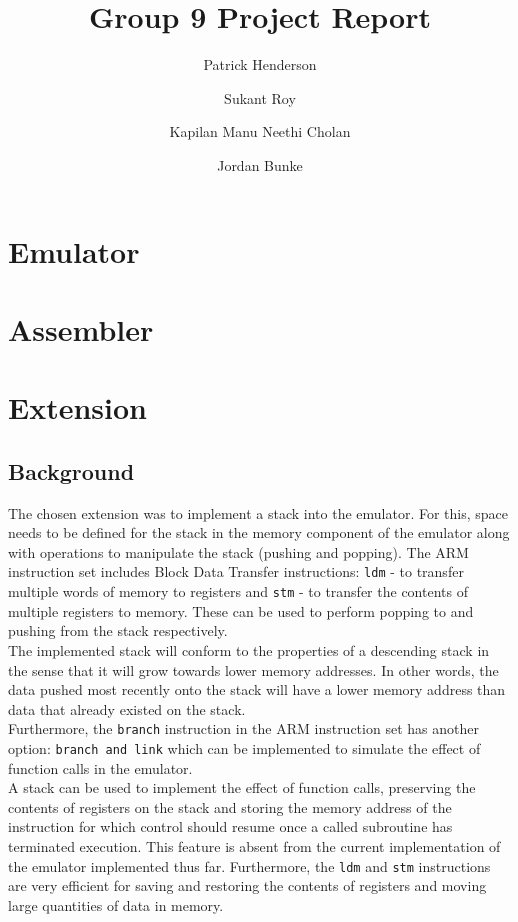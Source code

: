 \documentclass[11pt]{article}
\begin{document}
\title{Group 9 Project Report}
\author{Patrick Henderson\\
	\and
	Sukant Roy\\
	\and 
	Kapilan Manu Neethi Cholan\\
	\and 
	Jordan Bunke
}

\maketitle

\section{Emulator}

\section{Assembler}

\section{Extension}

\subsection{Background}

The chosen extension was to implement a stack into the emulator. For this, space needs to be defined for the stack in the memory component of the emulator along with operations to manipulate the stack (pushing and popping). The ARM instruction set includes Block Data Transfer instructions: \texttt{ldm} - to transfer multiple words of memory to registers and \texttt{stm} - to transfer the contents of multiple registers to memory. These can be used to perform popping to and pushing from the stack respectively.\\
\indent The implemented stack will conform to the properties of a descending stack in the sense that it will grow towards lower memory addresses. In other words, the data pushed most recently onto the stack will have a lower memory address than data that already existed on the stack.\\
\indent Furthermore, the \texttt{branch} instruction in the ARM instruction set has another option: \texttt{branch and link} which can be implemented to simulate the effect of function calls in the emulator. \\
\indent A stack can be used to implement the effect of function calls, preserving the contents of registers on the stack and storing the memory address of the instruction for which control should resume once a called subroutine has terminated execution. This feature is absent from the current implementation of the emulator implemented thus far. Furthermore, the \texttt{ldm} and \texttt{stm} instructions are very efficient for saving and restoring the contents of registers and moving large quantities of data in memory.
\end{document}
